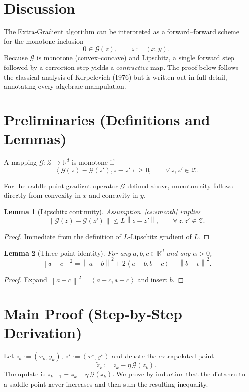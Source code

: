 \documentclass{article}
\newtheorem{lemma}{Lemma}
\newcommand{\R}{\mathbb{R}}
\newcommand{\norm}[1]{\left\|#1\right\|}
\newcommand{\inner}[2]{\left\langle #1,#2 \right\rangle}
\newcommand{\G}{\mathcal{G}}
\begin{document}
\section*{Discussion}
The Extra‑Gradient algorithm can be interpreted as a forward–forward scheme for the monotone inclusion
\[
0\in \G(z),\qquad z:=(x,y).
\]
Because $\G$ is monotone (convex–concave) and Lipschitz, a single forward step followed by a correction step yields a \emph{contractive} map. The proof below follows the classical analysis of Korpelevich (1976) but is written out in full detail, annotating every algebraic manipulation.

\section*{Preliminaries (Definitions and Lemmas)}
\begin{definition}
A mapping $\G:\mathcal{Z}\to\R^{d}$ is monotone if
\[
\inner{\G(z)-\G(z')}{z-z'}\ge 0,\qquad\forall\,z,z'\in\mathcal{Z}.
\]
\end{definition}
For the saddle‑point gradient operator $\G$ defined above, monotonicity follows directly from convexity in $x$ and concavity in $y$.

\begin{lemma}[Lipschitz continuity]\label{lem:lipschitz}
Assumption~\ref{as:smooth} implies
\[
\norm{\G(z)-\G(z')}\le L\norm{z-z'},\qquad\forall\,z,z'\in\mathcal{Z}.
\]
\end{lemma}
\begin{proof}
Immediate from the definition of $L$‑Lipschitz gradient of $L$.
\end{proof}

\begin{lemma}[Three‑point identity]\label{lem:three}
For any $a,b,c\in\R^{d}$ and any $\alpha>0$,
\[
\norm{a-c}^2 = \norm{a-b}^2 + 2\inner{a-b}{b-c} + \norm{b-c}^2.
\]
\end{lemma}
\begin{proof}
Expand $\norm{a-c}^2=\inner{a-c}{a-c}$ and insert $b$.
\end{proof}

\section*{Main Proof (Step‑by‑Step Derivation)}
Let $z_k:=(x_k,y_k)$, $z^\star:=(x^\star,y^\star)$ and denote the extrapolated point
\[
\tilde z_k:=z_k-\eta\,\G(z_k).
\]
The update is $z_{k+1}=z_k-\eta\,\G(\tilde z_k)$.  
We prove by induction that the distance to a saddle point never increases and then sum the resulting inequality.
\end{document}
